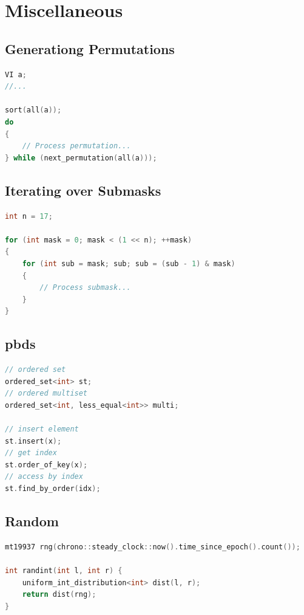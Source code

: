 \chapter{Miscellaneous}

\section{Generationg Permutations}
\begin{lstlisting}[language=C++]
VI a;
//...

sort(all(a));
do
{
    // Process permutation...
} while (next_permutation(all(a)));
\end{lstlisting}
\sectionend

\section{Iterating over Submasks}
\begin{lstlisting}[language=C++]
int n = 17;

for (int mask = 0; mask < (1 << n); ++mask)
{
    for (int sub = mask; sub; sub = (sub - 1) & mask)
    {
        // Process submask...
    }
}
\end{lstlisting}
\sectionend

\section{pbds}
\begin{lstlisting}[language=C++]
// ordered set
ordered_set<int> st;
// ordered multiset
ordered_set<int, less_equal<int>> multi;

// insert element
st.insert(x);
// get index
st.order_of_key(x);
// access by index
st.find_by_order(idx);
\end{lstlisting}
\sectionend

\section{Random}
\begin{lstlisting}[language=C++]
mt19937 rng(chrono::steady_clock::now().time_since_epoch().count());

int randint(int l, int r) {
    uniform_int_distribution<int> dist(l, r);
    return dist(rng);
}
\end{lstlisting}
\sectionend